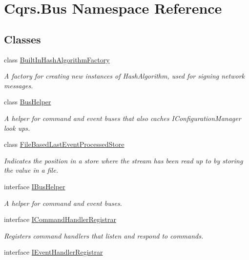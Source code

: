 \hypertarget{namespaceCqrs_1_1Bus}{}\section{Cqrs.\+Bus Namespace Reference}
\label{namespaceCqrs_1_1Bus}
\subsection*{Classes}
\begin{DoxyCompactItemize}
\item 
class \hyperlink{classCqrs_1_1Bus_1_1BuiltInHashAlgorithmFactory}{Built\+In\+Hash\+Algorithm\+Factory}
\begin{DoxyCompactList}\small\item\em A factory for creating new instances of Hash\+Algorithm, used for signing network messages. \end{DoxyCompactList}\item 
class \hyperlink{classCqrs_1_1Bus_1_1BusHelper}{Bus\+Helper}
\begin{DoxyCompactList}\small\item\em A helper for command and event buses that also caches I\+Configuration\+Manager look ups. \end{DoxyCompactList}\item 
class \hyperlink{classCqrs_1_1Bus_1_1FileBasedLastEventProcessedStore}{File\+Based\+Last\+Event\+Processed\+Store}
\begin{DoxyCompactList}\small\item\em Indicates the position in a store where the stream has been read up to by storing the value in a file. \end{DoxyCompactList}\item 
interface \hyperlink{interfaceCqrs_1_1Bus_1_1IBusHelper}{I\+Bus\+Helper}
\begin{DoxyCompactList}\small\item\em A helper for command and event buses. \end{DoxyCompactList}\item 
interface \hyperlink{interfaceCqrs_1_1Bus_1_1ICommandHandlerRegistrar}{I\+Command\+Handler\+Registrar}
\begin{DoxyCompactList}\small\item\em Registers command handlers that listen and respond to commands. \end{DoxyCompactList}\item 
interface \hyperlink{interfaceCqrs_1_1Bus_1_1IEventHandlerRegistrar}{I\+Event\+Handler\+Registrar}

\end{DoxyCompactItemize}
